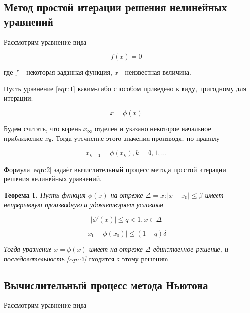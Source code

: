 \documentclass[12pt, a4paper]{article}
\begin{document}
	 	 \subsection{Метод простой итерации решения нелинейных уравнений}
	 
	 Рассмотрим уравнение вида
	 
	 \begin{equation} \label{eqn:1}
	 f(x)=0
	 \end{equation}
	 
	 
	 где $f$ -- некоторая заданная функция, $x$ - неизвестная величина. 
	 
	 Пусть уравнение \eqref{eqn:1} каким-либо способом приведено к виду, пригодному для итерации:
	 
	 \begin{equation} 
	 x=\phi(x)
	 \end{equation}
	 
	 Будем считать, что корень $x_\infty$ отделен и указано некоторое начальное приближение $x_0$. Тогда уточнение этого значения производят по правилу
	 
	 \begin{equation} \label{eqn:2}
	 x_{k+1} = \phi(x_k), k=0,1,\dots
	 \end{equation}
	 
	 Формула \eqref{eqn:2} задаёт вычислительный процесс метода простой итерации решения нелинейных уравнений.
	 
	 \textbf{Теорема 1.} \textit{Пусть функция $\phi(x)$ на отрезке $\Delta = {x: |x-x_0| \leq \beta}$ имеет непрерывную производную и удовлетворяет условиям}
	 
	 \begin{equation} \label{eqn:condition1}
	 	|\phi ' (x) | \leq q < 1, x \in \Delta
	 \end{equation}
	 
	 \begin{equation} \label{eqn:condition2}
	 	|x_0 - \phi(x_0)| \leq (1-q)\delta
	 \end{equation}
	 
	 \textit{Тогда уравнение $x=\phi(x)$ имеет на отрезке $\Delta$ единственное решение, и последовательность \eqref{eqn:2}} сходится к этому решению.
	 
	 \subsection{Вычислительный процесс метода Ньютона}
	 
	 Рассмотрим уравнение вида
	 
\end{document}
